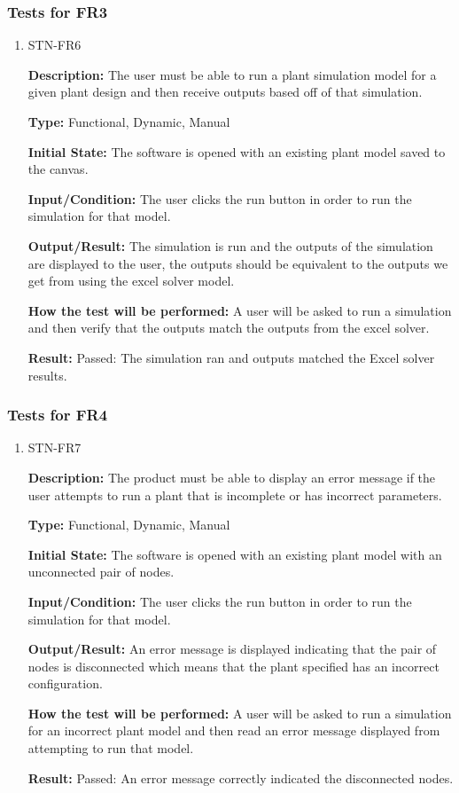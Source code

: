 \documentclass[12pt, titlepage]{article}
\begin{document}
\subsubsection{Tests for FR3}
\begin{enumerate}
\item{STN-FR6\\}

\textbf{Description:} The user must be able to run a plant simulation model for a given plant design and then receive outputs based off of that simulation.

\textbf{Type:} Functional, Dynamic, Manual

\textbf{Initial State:} The software is opened with an existing plant model saved to the canvas.

\textbf{Input/Condition:} The user clicks the run button in order to run the simulation for that model.

\textbf{Output/Result:} The simulation is run and the outputs of the simulation are displayed to the user, the outputs should be equivalent to the outputs we get from using the excel solver model.

\textbf{How the test will be performed:} A user will be asked to run a simulation and then verify that the outputs match the outputs from the excel solver.

\textbf{Result:} Passed: The simulation ran and outputs matched the Excel solver results.

\end{enumerate}

\subsubsection{Tests for FR4}
\begin{enumerate}
\item{STN-FR7\\}

\textbf{Description:} The product must be able to display an error message if the user attempts to run a plant that is incomplete or has incorrect parameters.

\textbf{Type:} Functional, Dynamic, Manual

\textbf{Initial State:} The software is opened with an existing plant model with an unconnected pair of nodes.

\textbf{Input/Condition:} The user clicks the run button in order to run the simulation for that model.

\textbf{Output/Result:} An error message is displayed indicating that the pair of nodes is disconnected which means that the plant specified has an incorrect configuration.

\textbf{How the test will be performed:} A user will be asked to run a simulation for an incorrect plant model and then read an error message displayed from attempting to run that model.

\textbf{Result:} Passed: An error message correctly indicated the disconnected nodes.

\end{enumerate}
\end{document}
